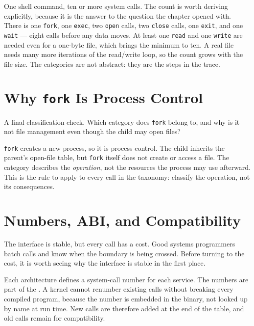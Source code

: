 \documentclass[11pt]{article}
\begin{document}
One shell command, ten or more system calls. The count is worth deriving
explicitly, because it is the answer to the question the chapter opened with.
There is one \texttt{fork}, one \texttt{exec}, two \texttt{open} calls, two
\texttt{close} calls, one \texttt{exit}, and one \texttt{wait} --- eight calls
before any data moves. At least one \texttt{read} and one \texttt{write} are
needed even for a one-byte file, which brings the minimum to ten. A real file
needs many more iterations of the read/write loop, so the count grows with the
file size. The categories are not abstract: they are the steps in the trace.

\section{Why \texttt{fork} Is Process Control}

A final classification check. Which category does \texttt{fork} belong to, and
why is it not file management even though the child may open files?

\texttt{fork} creates a new process, so it is process control. The child
inherits the parent's open-file table, but \texttt{fork} itself does not create
or access a file. The category describes the \emph{operation}, not the
resources the process may use afterward. This is the rule to apply to every
call in the taxonomy: classify the operation, not its consequences.

\section{Numbers, ABI, and Compatibility}

\noindent{}

The interface is stable, but every call has a cost. Good systems programmers
batch calls and know when the boundary is being crossed. Before turning to the
cost, it is worth seeing why the interface is stable in the first place.

Each architecture defines a system-call number for each service. The numbers
are part of the . A kernel cannot renumber
existing calls without breaking every compiled program, because the number is
embedded in the binary, not looked up by name at run time. New calls are
therefore added at the end of the table, and old calls remain for
compatibility.
\end{document}
